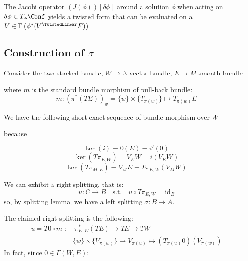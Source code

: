 \documentclass[a4paper,12pt]{scrartcl}  %
\begin{document}
\begin{remark}
	The Jacobi operator $\left(J(\phi) \right) [\delta \phi]$ around a solution $\phi$ when acting on $\delta \phi \in T_\phi \Conf$ yields a twisted form that can be evaluated on a $V \in \Gamma\left(\phi^\ast(V^\TwistedLinear F )\right)$
\end{remark}

\subsection{Construction of $\sigma$}
Consider the two stacked bundle, $ W \rightarrow E$ vector bundle, $E \rightarrow M$ smooth bundle.

where $m$ is the standard bundle morphism of pull-back bundle:
\begin{displaymath}
	m : \left( \pi^\ast \left( T E \right) \right)_w = \{w\} \times \{T_{\pi(w)} \} \mapsto T_{\pi(w)} E
\end{displaymath}

\begin{figure}
  \centering
  
\end{figure}

We have the following short exact sequence of bundle morphism over $W$
\begin{figure}
  \centering
  
\end{figure}
because

\begin{displaymath}
	\ker(i) = 0 (E) = i' \left( 0 \right)
\end{displaymath}
\begin{displaymath}
	\ker\left( T \pi_{E,W} \right) = V_E W = i\left( V_E W \right)
\end{displaymath}
\begin{displaymath}
	\ker\left(T \pi_{M,E}\right) = V_M E = T \pi_{E,W} \left( V_M W \right)
\end{displaymath}

We can exhibit a right splitting, that is:
\begin{displaymath}
	u : C \rightarrow B \quad \textrm{s.t.} \quad u \circ T \pi_{E,W} = \textrm{id}_B
\end{displaymath}
so, by splitting lemma, we have a left splitting $\sigma : B \rightarrow A$.

The claimed right splitting is the following:
\begin{align*}
		u = T0 \circ m \; : & \; \pi^\ast_{E,W} \left(TE \right) \rightarrow TE \rightarrow TW \\
						& \{w\} \times \{V_{\pi(w)} \} \mapsto V_{\pi(w)} \mapsto \left( T_{\pi(w)}0\right) (V_{\pi(w)})
\end{align*}
In fact, since $0 \in \Gamma (W,E)$:
\end{document}
